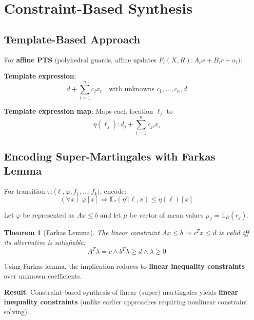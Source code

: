 \documentclass{article}
\newtheorem{theorem}{Theorem}
\begin{document}
\section{Constraint-Based Synthesis}

\subsection{Template-Based Approach}

For \textbf{affine PTS} (polyhedral guards, affine updates $F_i(X, R): A_i x + B_i r + a_i$):

\textbf{Template expression}:
\begin{equation}
d + \sum_{i=1}^n c_i x_i \quad \text{with unknowns } c_1, \ldots, c_n, d
\end{equation}

\textbf{Template expression map}: Maps each location $\ell_j$ to
\begin{equation}
\eta(\ell_j): d_j + \sum_{i=1}^n c_{ji} x_i
\end{equation}

\subsection{Encoding Super-Martingales with Farkas Lemma}

For transition $\tau: \langle \ell, \varphi, f_1, \ldots, f_k \rangle$, encode:
\begin{equation}
(\forall x) \, \varphi[x] \Rightarrow \mathbb{E}_\tau(\eta' | \ell, x) \leq \eta(\ell)[x]
\end{equation}

Let $\varphi$ be represented as $Ax \leq b$ and let $\mu$ be vector of mean values $\mu_j = \mathbb{E}_R(r_j)$.

\begin{theorem}[Farkas Lemma]
The linear constraint $Ax \leq b \Rightarrow c^T x \leq d$ is valid iff its alternative is satisfiable:
\begin{equation}
A^T \lambda = c \land b^T \lambda \geq d \land \lambda \geq 0
\end{equation}
\end{theorem}

Using Farkas lemma, the implication reduces to \textbf{linear inequality constraints} over unknown coefficients.

\textbf{Result}: Constraint-based synthesis of linear (super) martingales yields \textbf{linear inequality constraints} (unlike earlier approaches requiring nonlinear constraint solving).
\end{document}
